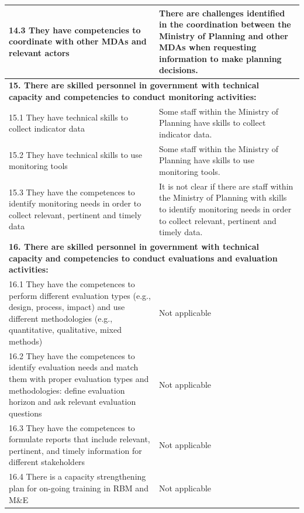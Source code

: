 \documentclass[
  10pt,
]{book}
\begin{document}
\begin{table}
\begin{tabular}[t]{l|l}
\hline
\hspace{1em}14.3 They have competencies to coordinate with other MDAs and relevant actors & There are challenges identified in the coordination between the Ministry of Planning and other MDAs when requesting information to make planning decisions.\\
\hline
\multicolumn{2}{l}{\textbf{15. There are skilled personnel in government with technical capacity and competencies to conduct monitoring activities:}}\\
\hline
\hspace{1em}15.1 They have technical skills to collect indicator data & Some staff within the Ministry of Planning have skills to collect indicator data.\\
\hline
\hspace{1em}15.2 They have technical skills to use monitoring tools & Some staff within the Ministry of Planning have skills to use monitoring tools.\\
\hline
\hspace{1em}15.3 They have the competences to identify monitoring needs in order to collect relevant, pertinent and timely data & It is not clear if there are staff within the Ministry of Planning with skills to identify monitoring needs in order to collect relevant, pertinent and timely data.\\
\hline
\multicolumn{2}{l}{\textbf{16. There are skilled personnel in government with technical capacity and competencies to conduct evaluations and evaluation activities:}}\\
\hline
\hspace{1em}16.1 They have the competences to perform different evaluation types (e.g., design, process, impact) and use different methodologies (e.g., quantitative, qualitative, mixed methods) & Not applicable\\
\hline
\hspace{1em}16.2 They have the competences to identify evaluation needs and match them with proper evaluation types and methodologies: define evaluation horizon and ask relevant evaluation questions & Not applicable\\
\hline
\hspace{1em}16.3 They have the competences to formulate reports that include relevant, pertinent, and timely information for different stakeholders & Not applicable\\
\hline
\hspace{1em}16.4 There is a capacity strengthening plan for on-going training in RBM and M\&E & Not applicable\\
\hline
\end{tabular}
\end{table}
\end{document}
